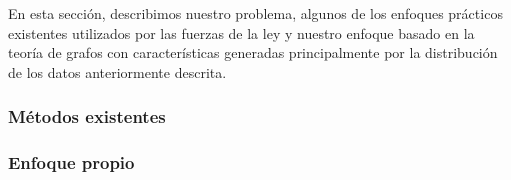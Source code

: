 En esta sección, describimos nuestro problema, algunos de los enfoques prácticos existentes utilizados por las fuerzas de la ley y nuestro enfoque basado en la teoría de grafos con características generadas principalmente por la distribución de los datos anteriormente descrita.

\subsubsection{Métodos existentes}


\subsubsection{Enfoque propio}

